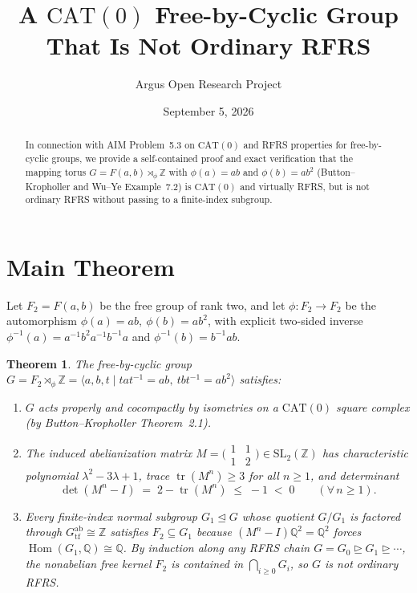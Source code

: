 \documentclass[10pt,reqno]{amsart}
\title[A $\mathrm{CAT}(0)$ Free-by-Cyclic Group That Is Not Ordinary RFRS]
{A $\mathrm{CAT}(0)$ Free-by-Cyclic Group That Is Not Ordinary RFRS}
\author{Argus Open Research Project}
\date{September 5, 2026}
\newtheorem{theorem}{Theorem}[section]
\theoremstyle{definition}
\begin{document}
\begin{abstract}
In connection with AIM Problem~5.3 on $\mathrm{CAT}(0)$ and RFRS properties for free-by-cyclic groups, we provide a self-contained proof and exact verification that the mapping torus $G = F(a,b)\rtimes_\phi\mathbb{Z}$ with $\phi(a)=ab$ and $\phi(b)=ab^2$ (Button--Kropholler and Wu--Ye Example~7.2) is $\mathrm{CAT}(0)$ and virtually RFRS, but is not ordinary RFRS without passing to a finite-index subgroup.
\end{abstract}
\maketitle
\section{Main Theorem}
Let $F_2=F(a,b)$ be the free group of rank two, and let $\phi:F_2\to F_2$ be the automorphism $\phi(a)=ab,\ \phi(b)=ab^2$, with explicit two-sided inverse $\phi^{-1}(a)=a^{-1}b^2a^{-1}b^{-1}a$ and $\phi^{-1}(b)=b^{-1}ab$.
\begin{theorem}
The free-by-cyclic group $G = F_2\rtimes_\phi\mathbb{Z} = \langle a,b,t \mid tat^{-1}=ab,\ tbt^{-1}=ab^2\rangle$ satisfies:
\begin{enumerate}[label=\textup{(\arabic*)}]
  \item $G$ acts properly and cocompactly by isometries on a $\mathrm{CAT}(0)$ square complex (by Button--Kropholler Theorem~2.1).
  \item The induced abelianization matrix $M=\bigl(\begin{smallmatrix}1 & 1\\ 1 & 2\end{smallmatrix}\bigr)\in\mathrm{SL}_2(\mathbb{Z})$ has characteristic polynomial $\lambda^2-3\lambda+1$, trace $\operatorname{tr}(M^n)\ge 3$ for all $n\ge 1$, and determinant
  \[
    \det(M^n - I) \;=\; 2 - \operatorname{tr}(M^n) \;\le\; -1 \;<\; 0 \qquad (\forall\, n\ge 1).
  \]
  \item Every finite-index normal subgroup $G_1\trianglelefteq G$ whose quotient $G/G_1$ is factored through $G^{\mathrm{ab}}_{\mathrm{tf}}\cong\mathbb{Z}$ satisfies $F_2\subseteq G_1$ because $(M^n-I)\mathbb{Q}^2=\mathbb{Q}^2$ forces $\operatorname{Hom}(G_1,\mathbb{Q})\cong\mathbb{Q}$. By induction along any RFRS chain $G=G_0\trianglerighteq G_1\trianglerighteq\cdots$, the nonabelian free kernel $F_2$ is contained in $\bigcap_{i\ge 0} G_i$, so $G$ is not ordinary RFRS.
\end{enumerate}
\end{theorem}
\end{document}
